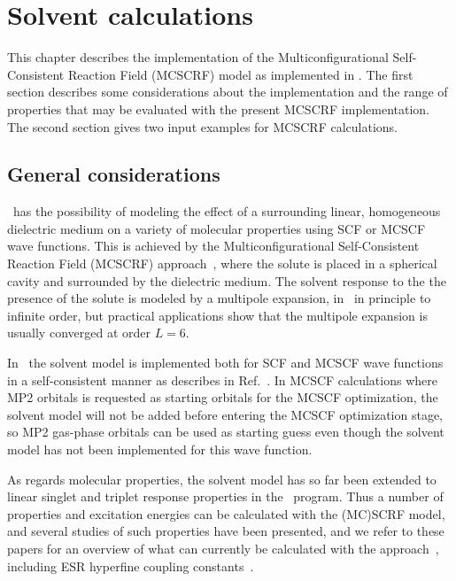 \chapter{Solvent calculations}\label{ch:solvent}

This chapter describes the implementation of the Multiconfigurational
Self-Consistent Reaction Field (MCSCRF) model as implemented in \siraba
. The first section describes some considerations about the
implementation  and the range of
properties that may be evaluated with the present MCSCRF
implementation. The second section gives two input examples for MCSCRF 
calculations.

\section{General considerations}\label{sec:solventimpl}

\siraba\ has the possibility of modeling the effect of a surrounding
linear, homogeneous dielectric medium on a
variety of molecular 
properties using
SCF or MCSCF
wave functions. This is achieved by the 
Multiconfigurational Self-Consistent Reaction Field
(MCSCRF)
approach~\cite{kvmedpsjpc91,kvmhahjajthjcp89}, where the solute is
placed in a spherical cavity and 
surrounded by the dielectric medium. The solvent response to the
the presence of the solute is modeled by a multipole
expansion, in \siraba\ in
principle to infinite order, but practical applications show that the
multipole expansion is usually converged at order $L=6$.

In \siraba\ the solvent model is implemented both for SCF and MCSCF wave
functions in a self-consistent manner as describes in
Ref.~\cite{kvmedpsjpc91,kvmhahjajthjcp89}. In MCSCF calculations where
MP2 orbitals is requested as starting orbitals for the MCSCF
optimization, the solvent model will not be added before entering the
MCSCF optimization stage, so MP2 gas-phase orbitals can be used as
starting guess even though the solvent model has not been implemented
for this wave function.

As regards molecular properties, the solvent model has so far been
extended to linear singlet and triplet response
properties in the
\resp\ program. Thus a number of properties and excitation energies can
be calculated with the (MC)SCRF model, and several studies of such
properties have been presented, and we refer to these papers for an
overview of what can currently be calculated with the
approach~\cite{kvmpjhjajjcp100,kvmylhapjjcp100}, including ESR
hyperfine coupling constants~\cite{bfocobpjkvmjcp104}. 

